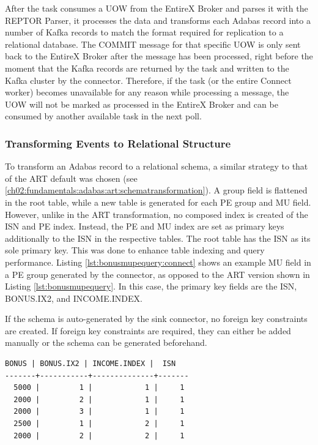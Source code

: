 After the task consumes a \ac{UOW} from the EntireX Broker and parses it with the \ac{REPTOR} Parser, it processes the data and transforms each Adabas record into a number of Kafka records to match the format required for replication to a relational database. The COMMIT message for that specific \ac{UOW} is only sent back to the EntireX Broker after the message has been processed, right before the moment that the Kafka records are returned by the task and written to the Kafka cluster by the connector. Therefore, if the task (or the entire Connect worker) becomes unavailable for any reason while processing a message, the \ac{UOW} will not be marked as processed in the EntireX Broker and can be consumed by another available task in the next poll.

\subsubsection{Transforming Events to Relational Structure}
\label{ch04:pipelinedevelopment:implementation:transformingtorelational}
To transform an Adabas record to a relational schema, a similar strategy to that of the \ac{ART} default was chosen (see \ref{ch02:fundamentals:adabas:art:schematransformation}). A group field is flattened in the root table, while a new table is generated for each PE group and MU field. However, unlike in the \ac{ART} transformation, no composed index is created of the \ac{ISN} and PE index. Instead, the PE and MU index are set as primary keys additionally to the \ac{ISN} in the respective tables. The root table has the \ac{ISN} as its sole primary key. This was done to enhance table indexing and query performance. Listing \ref{lst:bonusmupequery:connect} shows an example MU field in a PE group generated by the connector, as opposed to the \ac{ART} version shown in Listing \ref{lst:bonusmupequery}. In this case, the primary key fields are the \ac{ISN}, BONUS.IX2, and INCOME.INDEX.

If the schema is auto-generated by the sink connector, no foreign key constraints are created. If foreign key constraints are required, they can either be added manually or the schema can be generated beforehand.
\newpage
\begin{lstlisting}[frame=tb,caption={Query result of the MU field BONUS in the PE field INCOME in the relational table employees\_INCOME\_BONUS (Kafka Connect version)},label=lst:bonusmupequery:connect]
 BONUS | BONUS.IX2 | INCOME.INDEX |  ISN
-------+-----------+--------------+-------
  5000 |         1 |            1 |     1
  2000 |         2 |            1 |     1
  2000 |         3 |            1 |     1
  2500 |         1 |            2 |     1
  2000 |         2 |            2 |     1
\end{lstlisting}

